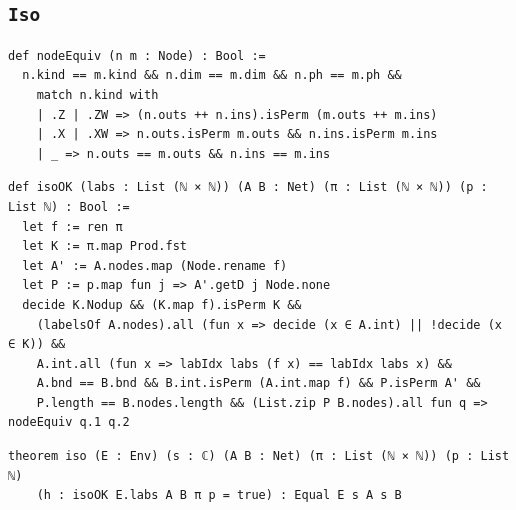 \subsection{\texttt{Iso}}
\begin{lstlisting}[style=leancore]
def nodeEquiv (n m : Node) : Bool :=
  n.kind == m.kind && n.dim == m.dim && n.ph == m.ph &&
    match n.kind with
    | .Z | .ZW => (n.outs ++ n.ins).isPerm (m.outs ++ m.ins)
    | .X | .XW => n.outs.isPerm m.outs && n.ins.isPerm m.ins
    | _ => n.outs == m.outs && n.ins == m.ins
\end{lstlisting}
\begin{lstlisting}[style=leancore]
def isoOK (labs : List (ℕ × ℕ)) (A B : Net) (π : List (ℕ × ℕ)) (p : List ℕ) : Bool :=
  let f := ren π
  let K := π.map Prod.fst
  let A' := A.nodes.map (Node.rename f)
  let P := p.map fun j => A'.getD j Node.none
  decide K.Nodup && (K.map f).isPerm K &&
    (labelsOf A.nodes).all (fun x => decide (x ∈ A.int) || !decide (x ∈ K)) &&
    A.int.all (fun x => labIdx labs (f x) == labIdx labs x) &&
    A.bnd == B.bnd && B.int.isPerm (A.int.map f) && P.isPerm A' &&
    P.length == B.nodes.length && (List.zip P B.nodes).all fun q => nodeEquiv q.1 q.2
\end{lstlisting}
\begin{lstlisting}[style=leancore]
theorem iso (E : Env) (s : ℂ) (A B : Net) (π : List (ℕ × ℕ)) (p : List ℕ)
    (h : isoOK E.labs A B π p = true) : Equal E s A s B
\end{lstlisting}


